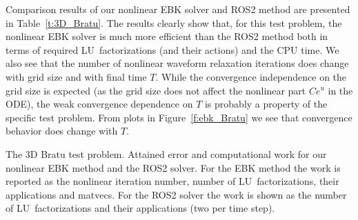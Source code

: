 \documentclass[sn-aps]{sn-jnl}
\theoremstyle{thmstyleone}%
\theoremstyle{thmstyletwo}%
\theoremstyle{thmstylethree}%
\begin{document}
Comparison results of our nonlinear EBK solver and ROS2 method are presented in
Table~\ref{t:3D_Bratu}.  The results clearly show that, for this test problem,
the nonlinear EBK solver is much more efficient than the ROS2 method both
in terms of required LU~factorizations (and their actions) and the CPU time.
We also see that the number of nonlinear waveform relaxation iterations does change
with grid size and with final time $T$. 
While the convergence independence on the grid size is expected (as the 
grid size does not affect the nonlinear part $Ce^u$ in the ODE),
the weak convergence dependence on $T$ is probably a property
of the specific test problem.  From plots in Figure~\ref{f:ebk_Bratu}
we see that convergence behavior does change with $T$. 

\begin{table}
\caption{The 3D Bratu test problem.  Attained error and 
computational work for our nonlinear EBK method and 
the ROS2 solver. 
For the EBK method the work is reported as the nonlinear iteration number,
number of LU~factorizations, their applications and matvecs.
For the ROS2 solver the work is shown as the number of LU~factorizations 
and their applications (two per time step).}
\label{t:3D_Bratu}  


\end{table}
\end{document}

